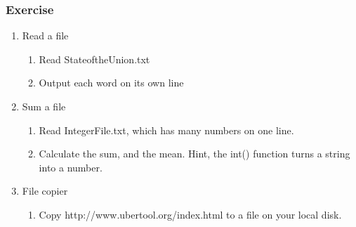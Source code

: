 \documentclass{beamer}
\begin{document}
\begin{frame}[fragile]
\frametitle{Exercise}
\begin{enumerate}
\item Read a file
\begin{enumerate}
\item Read StateoftheUnion.txt
\item Output each word on its own line
\end{enumerate}
\item Sum a file
\begin{enumerate}
\item Read IntegerFile.txt, which has many numbers on one line.
\item Calculate the sum, and the mean. Hint, the int() function turns a string into a number.  
\end{enumerate}
\item File copier
\begin{enumerate}
\item Copy http://www.ubertool.org/index.html to a file on your local disk.
\end{enumerate}
\end{enumerate} 
\end{frame}
\end{document}
